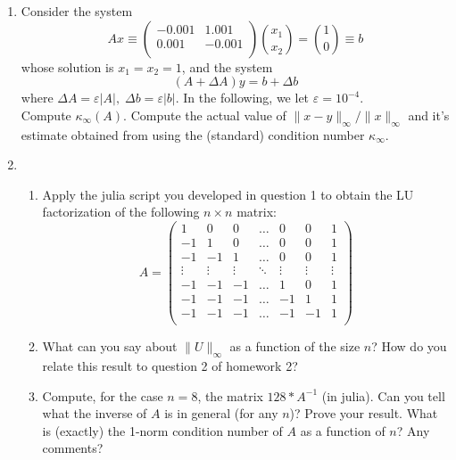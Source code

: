 \documentclass[11pt]{article}
\newcommand{\n}{\vspace{0.3cm}}
\begin{document}
\begin{enumerate}
	\item Consider the system
	      \[
		      Ax \equiv \left(\begin{array}{rr} -0.001 & 1.001 \\ 0.001 & -0.001 \\ \end{array}\right)
		      \binom{x_1}{x_2} = \binom10 \equiv b
	      \]
	      whose solution is \(x_1 = x_2 = 1\), and the system
	      \[(A + \Delta A)y = b + \Delta b\]
	      where \(\Delta A = \varepsilon|A|, \; \Delta b = \varepsilon|b|\).  In the following, we let \(\varepsilon = 10^{-4}\). \n\\
	      Compute \(\kappa_\infty(A)\).  Compute the actual value of \(\lVert x-y \rVert_\infty / \lVert x \rVert_\infty\) and it's estimate obtained from using the (standard) condition number \(\kappa_\infty\).

	\item \begin{enumerate}
		      \item Apply the julia script you developed in question 1 to obtain the LU factorization of the following \(n \times n\) matrix:
		            \[A = \left(\begin{array}{rrrrrrr}
					            1      & 0      & 0      & \hdots & 0      & 0      & 1      \\
					            -1     & 1      & 0      & \hdots & 0      & 0      & 1      \\
					            -1     & -1     & 1      & \hdots & 0      & 0      & 1      \\
					            \vdots & \vdots & \vdots & \ddots & \vdots & \vdots & \vdots \\
					            -1     & -1     & -1     & \hdots & 1      & 0      & 1      \\
					            -1     & -1     & -1     & \hdots & -1     & 1      & 1      \\
					            -1     & -1     & -1     & \hdots & -1     & -1     & 1      \\
				            \end{array}\right)\]
		      \item What can you say about \(\lVert U \rVert_\infty\) as a function of the size \(n\)?  How do you relate this result to question 2 of homework 2?
		      \item Compute, for the case \(n=8\), the matrix \(128 * A^{-1}\) (in julia).  Can you tell what the inverse of \(A\) is in general (for any \(n\))?  Prove your result.  What is (exactly) the 1-norm condition number of \(A\) as a function of \(n\)?  Any comments?
	      \end{enumerate}

\end{enumerate}
\end{document}
